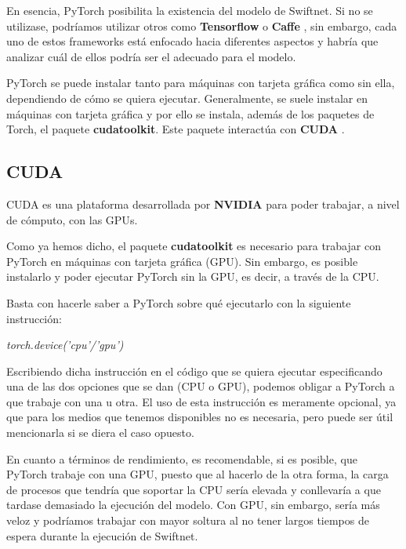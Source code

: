 En esencia, PyTorch posibilita la existencia del modelo de Swiftnet. Si no se utilizase, podríamos utilizar otros como \textbf{Tensorflow} \cite{tensorflow} o \textbf{Caffe} \cite{caffe}, sin embargo, cada uno de estos frameworks está enfocado hacia diferentes aspectos y habría que analizar cuál de ellos podría ser el adecuado para el modelo. 

PyTorch se puede instalar tanto para máquinas con tarjeta gráfica como sin ella, dependiendo de cómo se quiera ejecutar. Generalmente, se suele instalar en máquinas con tarjeta gráfica y por ello se instala, además de los paquetes de Torch, el paquete \textbf{cudatoolkit}. Este paquete interactúa con \textbf{CUDA} \cite{cuda}.

\subsection{CUDA}

CUDA \cite{cuda} es una plataforma desarrollada por \textbf{NVIDIA} para poder trabajar, a nivel de cómputo, con las \ac{GPU}s.

Como ya hemos dicho, el paquete \textbf{cudatoolkit} es necesario para trabajar con PyTorch en máquinas con tarjeta gráfica (\ac{GPU}). Sin embargo, es posible instalarlo y poder ejecutar PyTorch sin la \ac{GPU}, es decir, a través de la \ac{CPU}.

Basta con hacerle saber a PyTorch sobre qué ejecutarlo con la siguiente instrucción:

\begin{center}
\textit{torch.device('cpu'/'gpu')}
\end{center}

Escribiendo dicha instrucción en el código que se quiera ejecutar especificando una de las dos opciones que se dan (\ac{CPU} o \ac{GPU}), podemos obligar a PyTorch a que trabaje con una u otra. El uso de esta instrucción es meramente opcional, ya que para los medios que tenemos disponibles no es necesaria, pero puede ser útil mencionarla si se diera el caso opuesto.

En cuanto a términos de rendimiento, es recomendable, si es posible, que PyTorch trabaje con una \ac{GPU}, puesto que al hacerlo de la otra forma, la carga de procesos que tendría que soportar la \ac{CPU} sería elevada y conllevaría a que tardase demasiado la ejecución del modelo. Con \ac{GPU}, sin embargo, sería más veloz y podríamos trabajar con mayor soltura al no tener largos tiempos de espera durante la ejecución de Swiftnet.


